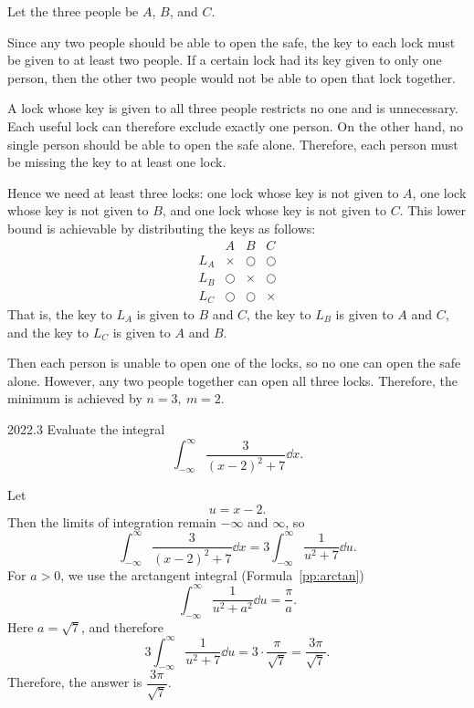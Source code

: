     \begin{solution}
        Let the three people be $A$, $B$, and $C$.

        Since any two people should be able to open the safe, the key to each lock must be given to
        at least two people. If a certain lock had its key given to only one person, then the other
        two people would not be able to open that lock together.

        A lock whose key is given to all three people restricts no one and is unnecessary. Each useful lock can therefore exclude exactly one person. On the
        other hand, no single person should be able to open the safe alone. Therefore, each person
        must be missing the key to at least one lock.

        Hence we need at least three locks: one lock whose key is not given to $A$, one lock whose
        key is not given to $B$, and one lock whose key is not given to $C$. This lower bound is
        achievable by distributing the keys as follows:
        \[
            \begin{array}{c|ccc}
                & A & B & C \\
                \hline
                L_A & \times & \bigcirc & \bigcirc \\
                L_B & \bigcirc & \times & \bigcirc \\
                L_C & \bigcirc & \bigcirc & \times
            \end{array}
        \]
        That is, the key to $L_A$ is given to $B$ and $C$, the key to $L_B$ is given to $A$ and $C$,
        and the key to $L_C$ is given to $A$ and $B$.

        Then each person is unable to open one of the locks, so no one can open the safe alone.
        However, any two people together can open all three locks. Therefore, the minimum is
        achieved by $\boxed{n=3,\ m=2}$.
    \end{solution}

    \begin{pastproblem}{2022.3}
        Evaluate the integral
        \[
            \int_{-\infty}^{\infty}
            \frac{3}{(x-2)^2+7}\dd x.
        \]
    \end{pastproblem}

    \begin{solution}
        Let
        \[
            u=x-2.
        \]
        Then the limits of integration remain $-\infty$ and $\infty$, so
        \[
            \int_{-\infty}^{\infty}
            \frac{3}{(x-2)^2+7}\dd x
            =
            3\int_{-\infty}^{\infty}
            \frac{1}{u^2+7}\dd u.
        \]
        For $a>0$, we use the arctangent integral (Formula~\ref{pp:arctan})
        \[
            \int_{-\infty}^{\infty}
            \frac{1}{u^2+a^2}\dd u
            =
            \frac{\pi}{a}.
        \]
        Here $a=\sqrt{7}$, and therefore
        \[
            3\int_{-\infty}^{\infty}
            \frac{1}{u^2+7}\dd u
            =
            3\cdot\frac{\pi}{\sqrt{7}}
            =
            \frac{3\pi}{\sqrt{7}}.
        \]
        Therefore, the answer is $\boxed{\dfrac{3\pi}{\sqrt{7}}}$.
    \end{solution}

